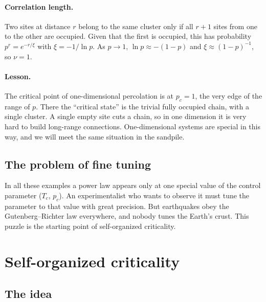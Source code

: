 \paragraph{Correlation length.} Two sites at distance $r$ belong to the same cluster only if all $r+1$ sites from
one to the other are occupied. Given that the first is occupied, this has probability $p^{r} = e^{-r/\xi}$ with
$\xi = -1/\ln p$. As $p\to1$, $\ln p\approx -(1-p)$ and $\xi\approx(1-p)^{-1}$, so $\nu = 1$.

\paragraph{Lesson.} The critical point of one-dimensional percolation is at $p_c = 1$, the very edge of the range
of $p$. There the ``critical state'' is the trivial fully occupied chain, with a single cluster. A single empty
site cuts a chain, so in one dimension it is very hard to build long-range connections. One-dimensional
systems are special in this way, and we will meet the same situation in the sandpile.

\subsection{The problem of fine tuning}

In all these examples a power law appears only at one special value of the control parameter ($T_c$, $p_c$).
An experimentalist who wants to observe it must tune the parameter to that value with great precision. But
earthquakes obey the Gutenberg--Richter law everywhere, and nobody tunes the Earth's crust. This puzzle is
the starting point of self-organized criticality.

\section{Self-organized criticality}
\label{sec:soc}

\subsection{The idea}

